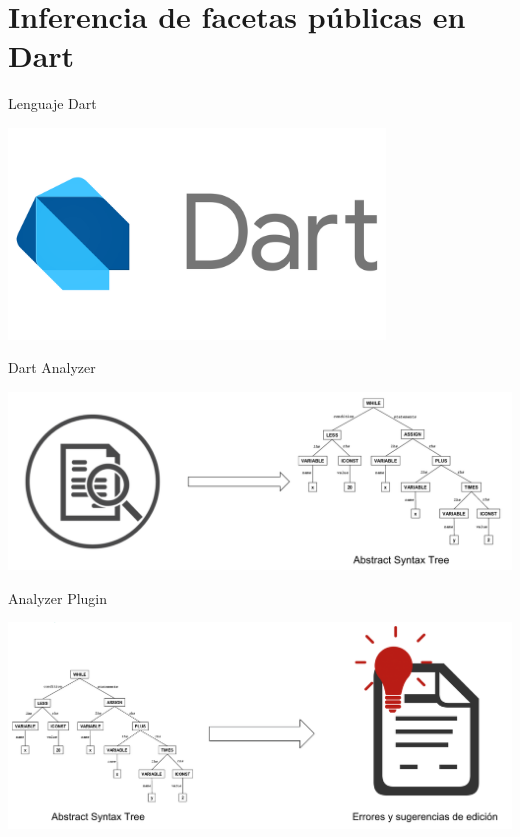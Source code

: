 \documentclass[aspectratio=169,10pt]{beamer}
\begin{document}
\section{Inferencia de facetas públicas en Dart}

\begin{frame}[fragile]{Lenguaje Dart}
	\begin{center}
		\includegraphics[width=0.75\textwidth]{images/dart.png}
	\end{center}
\end{frame}

\begin{frame}[fragile]{Dart Analyzer}
	\begin{center}
		\includegraphics[width=1.0\textwidth]{images/ast.png}
	\end{center}
\end{frame}

\begin{frame}[fragile]{Analyzer Plugin}
		\begin{center}
      \includegraphics[width=1.0\textwidth]{images/plugin.png}
		\end{center}
\end{frame}
\end{document}
